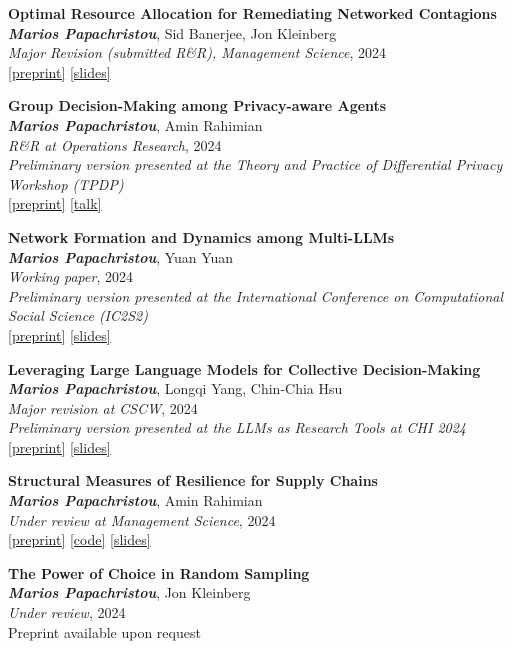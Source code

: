 \documentclass[margin]{res}
\newcommand{\specialurl}[2]{\href {#2} {{{[#1]}}}}
\newcommand{\preprint}[1]{\specialurl {preprint} {#1}}
\newcommand{\code}[1]{\specialurl {code} {#1}}
\newcommand{\talk}[1]{\specialurl {talk} {#1}}
\newcommand{\slides}[1]{\specialurl {slides} {#1}}
\newcommand{\authorref}[1]{{\textit{\textbf{#1}}}}
\newcommand{\authorme}{\authorref{Marios Papachristou}}
\newcommand{\publication}[5]{\textbf{#1}\\{#2}\\\emph{#3}, {#4}\\{#5}\smallskip}
\begin{document}
\begin{resume}
{\begin{enumerate}[nosep, label={[WP\arabic*]}]
   \item \publication{Optimal Resource Allocation for Remediating Networked Contagions}{\authorme, Sid Banerjee, Jon Kleinberg}{Major Revision (submitted R\&R), Management Science}{2024}{\preprint{https://papers.ssrn.com/sol3/papers.cfm?abstract_id=4880536} \slides{https://drive.google.com/file/d/1DgOCnJ5Pf3Je-F7a-Adiy2TTZ7oZUbbB/view?usp=sharing}} 
      \item \publication{Group Decision-Making among Privacy-aware Agents}{\authorme, Amin Rahimian}{R\&R at Operations Research}{2024}{
  		\emph{Preliminary version presented at the Theory and Practice of Differential Privacy Workshop (TPDP)} \\ \preprint{https://arxiv.org/pdf/2402.08156.pdf} \talk{https://www.youtube.com/watch?v=Kmm5HEMuS4w}}
  		
   \item \publication{Network Formation and Dynamics among Multi-LLMs}{\authorme, Yuan Yuan}{Working paper}{2024}{\emph{Preliminary version presented at the International Conference on Computational Social Science (IC2S2)} \\ \preprint{http://arxiv.org/abs/2402.10659} \slides{https://drive.google.com/file/d/13Qm_82D0WrkmN1LAv2AUmjcputMOdm_y/view?usp=drive_link}} 
      
   \item \publication{Leveraging Large Language Models for Collective Decision-Making}{\authorme, Longqi Yang, Chin-Chia Hsu}{Major revision at CSCW}{2024}{\emph{Preliminary version presented at the LLMs as Research Tools at CHI 2024} \\ \preprint{https://arxiv.org/abs/2311.04928} \slides{https://docs.google.com/presentation/d/13IsUt68rFoKdtq8wquL9fxVFHwH0hgvN/edit?usp=drive_link&ouid=109899272296285628946&rtpof=true&sd=true}}


   	   
   \item \publication{Structural Measures of Resilience for Supply Chains}{\authorme, Amin Rahimian}{Under review at Management Science}{2024}{ 
   		\preprint{https://papers.ssrn.com/sol3/papers.cfm?abstract_id=4392226} \code{https://github.com/papachristoumarios/supply-chain-resilience} \slides{https://drive.google.com/file/d/13kgKnjTHyO8j4BOJVykWwt43hSt3JrLw/view?usp=drive_link}}
   		
   	\item \publication{The Power of Choice in Random Sampling}{\authorme, Jon Kleinberg}{Under review}{2024}{Preprint available upon request}
   

\end{enumerate}}
\end{resume}
\end{document}
